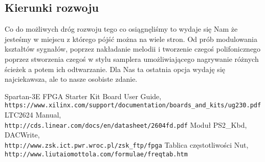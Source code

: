\documentclass[11pt]{article}
\begin{document}
	\subsection{Kierunki rozwoju}	
	Co do możliwych dróg rozwoju tego co osiągnęliśmy to wydaje się Nam że jesteśmy w miejscu z którego pójść można na wiele stron. Od prób modulowania kształtów sygnałów, poprzez nakładanie melodii i tworzenie czegoś polifonicznego poprzez stworzenia czegoś w stylu samplera umożliwiającego nagrywanie różnych ścieżek a potem ich odtwarzanie. Dla Nas ta ostatnia opcja wydaję się najciekawsza, ale to nasze osobiste zdanie.
	\newpage
	
	\begin{thebibliography}{9}		
		Spartan-3E FPGA Starter Kit Board User Guide,
		\\\texttt{https://www.xilinx.com/support/documentation/boards\_and\_kits/ug230.pdf}
		LTC2624 Manual,
		\\\texttt{http://cds.linear.com/docs/en/datasheet/2604fd.pdf}
		Moduł PS2\_Kbd, DACWrite,
		\\\texttt{http://www.zsk.ict.pwr.wroc.pl/zsk\_ftp/fpga}
		Tablica częstotliwości Nut,
		\\\texttt{http://www.liutaiomottola.com/formulae/freqtab.htm}
	\end{thebibliography}
	
\end{document}
